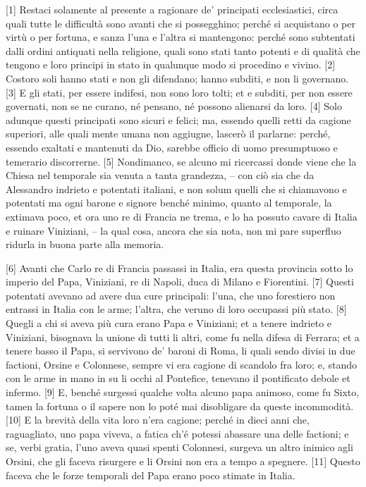 {[}1{]} Restaci solamente al presente a ragionare de' principati
ecclesiastici, circa quali tutte le difficultà sono avanti che si
possegghino; perché si acquistano o per virtù o per fortuna, e sanza
l'una e l'altra si mantengono: perché sono subtentati dalli ordini
antiquati nella religione, quali sono stati tanto potenti e di qualità
che tengono e loro principi in stato in qualunque modo si procedino e
vivino. {[}2{]} Costoro soli hanno stati e non gli difendano; hanno
subditi, e non li governano. {[}3{]} E gli stati, per essere indifesi,
non sono loro tolti; et e subditi, per non essere governati, non se ne
curano, né pensano, né possono alienarsi da loro. {[}4{]} Solo adunque
questi principati sono sicuri e felici; ma, essendo quelli retti da
cagione superiori, alle quali mente umana non aggiugne, lascerò il
parlarne: perché, essendo exaltati e mantenuti da Dio, sarebbe officio
di uomo presumptuoso e temerario discorrerne. {[}5{]} Nondimanco, se
alcuno mi ricercassi donde viene che la Chiesa nel temporale sia venuta
a tanta grandezza, -- con ciò sia che da Alessandro indrieto e potentati
italiani, e non solum quelli che si chiamavono e potentati ma ogni
barone e signore benché minimo, quanto al temporale, la extimava poco,
et ora uno re di Francia ne trema, e lo ha possuto cavare di Italia e
ruinare Viniziani, -- la qual cosa, ancora che sia nota, non mi pare
superfluo ridurla in buona parte alla memoria.

{[}6{]} Avanti che Carlo re di Francia passassi in Italia, era questa
provincia sotto lo imperio del Papa, Viniziani, re di Napoli, duca di
Milano e Fiorentini. {[}7{]} Questi potentati avevano ad avere dua cure
principali: l'una, che uno forestiero non entrassi in Italia con le
arme; l'altra, che veruno di loro occupassi più stato. {[}8{]} Quegli a
chi si aveva più cura erano Papa e Viniziani; et a tenere indrieto e
Viniziani, bisognava la unione di tutti li altri, come fu nella difesa
di Ferrara; et a tenere basso il Papa, si servivono de' baroni di Roma,
li quali sendo divisi in due factioni, Orsine e Colonnese, sempre vi era
cagione di scandolo fra loro; e, stando con le arme in mano in su li
occhi al Pontefice, tenevano il pontificato debole et infermo. {[}9{]}
E, benché surgessi qualche volta alcuno papa animoso, come fu Sixto,
tamen la fortuna o il sapere non lo poté mai disobligare da queste
incommodità. {[}10{]} E la brevità della vita loro n'era cagione; perché
in dieci anni che, raguagliato, uno papa viveva, a fatica ch'é potessi
abassare una delle factioni; e se, verbi gratia, l'uno aveva quasi
spenti Colonnesi, surgeva un altro inimico agli Orsini, che gli faceva
risurgere e li Orsini non era a tempo a spegnere. {[}11{]} Questo faceva
che le forze temporali del Papa erano poco stimate in Italia.

